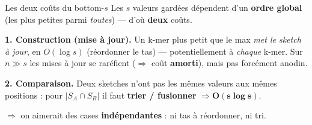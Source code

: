 \documentclass[aspectratio=169,11pt]{beamer}
\begin{document}
\begin{frame}{Les deux coûts du bottom-$s$}
  \footnotesize
  Les $s$ valeurs gardées dépendent d'un \textbf{ordre global} (les plus petites parmi
  \emph{toutes}) — d'où \textbf{deux} coûts.
  \smallskip

  \textbf{1. Construction (mise à jour).} Un k-mer plus petit que le max \emph{met le
  sketch à jour}, en $O(\log s)$ (réordonner le tas) — potentiellement à \emph{chaque}
  k-mer. \textcolor{cGray}{Sur $n \gg s$ les mises à jour se raréfient ($\Rightarrow$ coût
  \textbf{amorti}), mais pas forcément anodin.}
  \smallskip

  \textbf{2. Comparaison.} Deux sketches n'ont pas les mêmes valeurs aux mêmes positions :
  pour $|S_A\cap S_B|$ il faut \textbf{trier / fusionner} $\Rightarrow \mathbf{O(s\log s)}$.

  \medskip
  \centering

  \smallskip
  {\footnotesize\textcolor{cGreen}{$\Rightarrow$ on aimerait des cases \textbf{indépendantes} :
  ni tas à réordonner, ni tri.}}
\end{frame}
\end{document}
